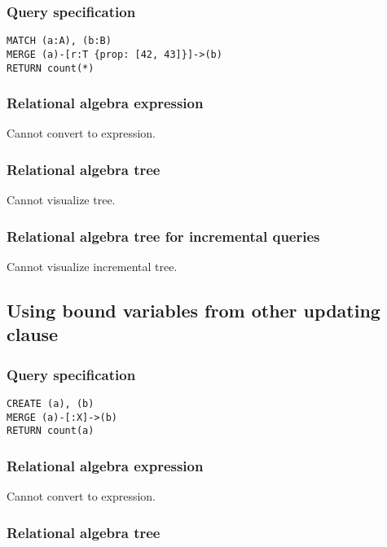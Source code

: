 \subsubsection*{Query specification}

\begin{lstlisting}
MATCH (a:A), (b:B)
MERGE (a)-[r:T {prop: [42, 43]}]->(b)
RETURN count(*)
\end{lstlisting}

\subsubsection*{Relational algebra expression}

Cannot convert to expression.

\subsubsection*{Relational algebra tree}

Cannot visualize tree.

\subsubsection*{Relational algebra tree for incremental queries}

Cannot visualize incremental tree.

\subsection{Using bound variables from other updating clause}

\subsubsection*{Query specification}

\begin{lstlisting}
CREATE (a), (b)
MERGE (a)-[:X]->(b)
RETURN count(a)
\end{lstlisting}

\subsubsection*{Relational algebra expression}

Cannot convert to expression.

\subsubsection*{Relational algebra tree}

